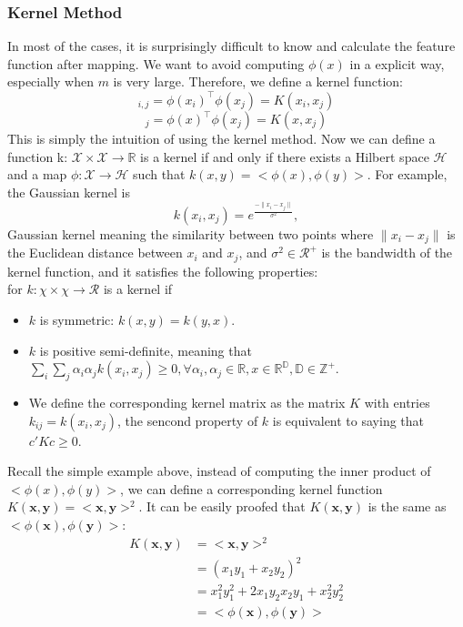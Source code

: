 \subsubsection{Kernel Method}
In most of the cases, it is surprisingly difficult to know and calculate the feature function after mapping. We want to avoid computing $\phi(x)$ in a explicit way, 
especially when $m$ is very large. Therefore, we define a kernel function:
\begin{equation*}
    [\Phi\Phi^\top]_{i,j}=\phi(x_i)^\top \phi(x_j)=K(x_i,x_j)
\end{equation*}
\begin{equation}
    [\phi(x)^\top\Phi^\top]_j=\phi(x)^\top\phi(x_j)=K(x,x_j)
\end{equation}
This is simply the intuition of using the kernel method. Now we can define a function k: $\mathcal{X} \times \mathcal{X}  \rightarrow \mathbb{R}$ is a kernel if and 
only if there exists a Hilbert space $\mathcal{H}$ and a map $\phi: \mathcal{X}\rightarrow\mathcal{H}$ such that $k(x,y)=<\phi(x),\phi(y)>$. For example, the Gaussian kernel is
\begin{equation}
    k(x_i, x_j) = e^\frac{-\parallel x_i - x_j \parallel}{\sigma^2},
\end{equation}
Gaussian kernel meaning the similarity between two points where $\parallel x_i - x_j \parallel$ is the Euclidean distance between $x_i$ and $x_j$, and $\sigma^2 \in \mathcal{R}^+$ is the bandwidth of the kernel function, and it satisfies the 
following properties:\\
for $k: \chi \times \chi \rightarrow \mathcal{R}$ is a kernel if
\begin{itemize}
    \item $k$ is symmetric: $k(x,y) = k(y,x)$.
    \item $k$ is positive semi-definite, meaning that $\sum_{i} \sum_{j} \alpha_i \alpha_j k(x_i,x_j)\geq0, \forall \alpha_i, \alpha_j \in \mathbb{R}, x \in \mathbb{R}^\mathbb{D}, \mathbb{D} \in \mathbb{Z}^+$. 
    \item We define the corresponding kernel matrix as the matrix $K$ with entries $k_{ij}=k(x_i,x_j)$, the sencond property of $k$ is equivalent to saying that $c'Kc \geq0$.
\end{itemize}
Recall the simple example above, instead of computing the inner product of $<\phi(x),\phi(y)>$, we can define 
a corresponding kernel function $K(\textbf{x},\textbf{y})=<\textbf{x},\textbf{y}>^2$. It can be easily proofed that $K(\textbf{x},\textbf{y})$ is the same as $<\phi(\textbf{x}),\phi(\textbf{y})>$:
\begin{align*}
    K(\textbf{x},\textbf{y})&=<\textbf{x},\textbf{y}>^2\\
                            &=(x_1y_1+x_2y_2)^2\\
                            &=x_1^2y_1^2+2x_1y_2x_2y_1+x_2^2y_2^2\\
                            &=<\phi(\textbf{x}),\phi(\textbf{y})>
\end{align*}

